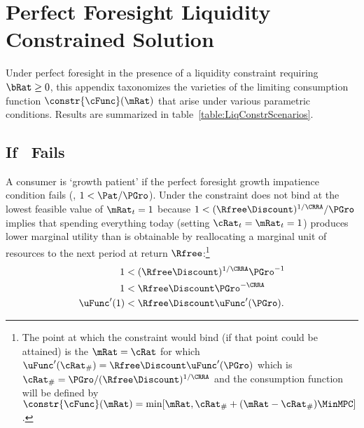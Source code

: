 \documentclass[\econtexRoot/BufferStockTheory]{subfiles}
\begin{document}
\let\TableWidth\relax
\newlength\TableWidth
\providecommand{\FigDir}{\econtexRoot/Code/Mathematica/Results/BufferStockTheory/Figures}

\section{Perfect Foresight Liquidity Constrained Solution}\label{sec:ApndxLiqConstr}

Under perfect foresight in the presence of a liquidity constraint requiring $\bRat
\geq 0$, this appendix taxonomizes the varieties of the limiting
consumption function $\constr{\cFunc}(\mRat)$ that arise under various parametric conditions.  Results are summarized in table~\ref{table:LiqConstrScenarios}.



\subsection{If \PFGIC~Fails}

A consumer is `growth patient' if the perfect foresight growth
impatience condition fails (\cncl{\PFGIC}, $1 < \Pat/\PGro$).  Under
\cncl{\PFGIC} the constraint does not bind at the lowest feasible value of $\mRat_{t}=1$ because
$1 < (\Rfree\Discount)^{1/\CRRA}/\PGro$ implies that spending
everything today (setting $\cRat_{t}=\mRat_{t}=1$) produces lower
marginal utility than is obtainable by reallocating a marginal unit of
resources to the next period at return $\Rfree$:\footnote{The point at
  which the constraint would bind (if that point could be attained) is
  the $\mRat=\cRat$ for which $\uFunc^{\prime}(\cRat_{\#}) = \Rfree
  \Discount \uFunc^{\prime}(\PGro)$ which is $\cRat_{\#} =
  \PGro/(\Rfree \Discount)^{1/\CRRA}$ and the consumption function
  will be defined by
  $\constr{\cFunc}(\mRat)=\min[\mRat,\cRat_{\#}+(\mRat-\cRat_{\#})\MinMPC
  ]$.}
\begin{equation}\begin{gathered}\begin{aligned}
  1  & < (\Rfree \Discount)^{1/\CRRA}\PGro^{-1}    \notag
  \\ 1  & < \Rfree \Discount \PGro^{-\CRRA} \notag
  \\  \uFunc^{\prime}(1)  & < \Rfree \Discount \uFunc^{\prime}(\PGro)   \label{eq:EulerPFGICFailsEnd}.
\end{aligned}\end{gathered}\end{equation}
\end{document}
